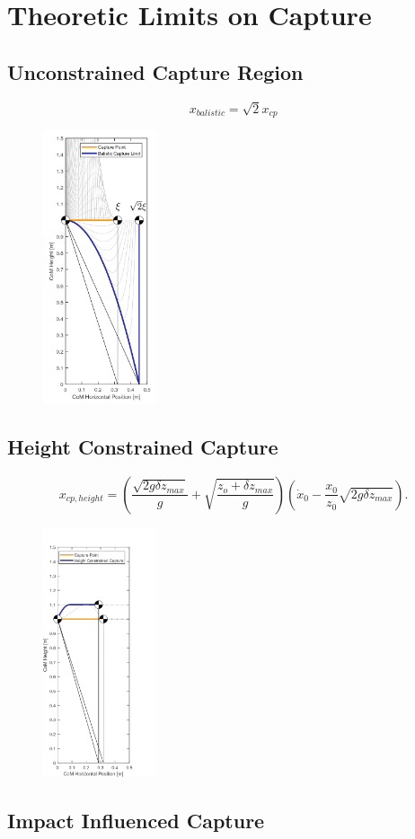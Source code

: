%
\chapter{Theoretic Limits on Capture}



\section{Unconstrained Capture Region}
\begin{equation}
    x_{balistic}=\sqrt{2}x_{cp}
    \end{equation}

\cite{koolen2016balance}
\begin{figure}[h]
\centering
\includegraphics[width=0.3\textwidth]{STYLESTUFF/CPvsBalistic.png}
\caption{}
\label{fig:cpbal}
\end{figure}
\section{Height Constrained Capture}
\begin{equation}
    x_{cp,height}=(\frac{\sqrt{2g\delta z_{max}}}{g}+\sqrt{\frac{z_o+\delta z_{max}}{g}})(\dot{x}_0-\frac{x_0}{z_0}\sqrt{2g\delta z_{max}}).
\end{equation}
\begin{figure}[h]
\centering
\includegraphics[width=0.3\textwidth]{STYLESTUFF/CPvsHeight.png}
\caption{}
\label{fig:cpbal}
\end{figure}

\section{Impact Influenced Capture}
\cite{kuo2005energetic}
